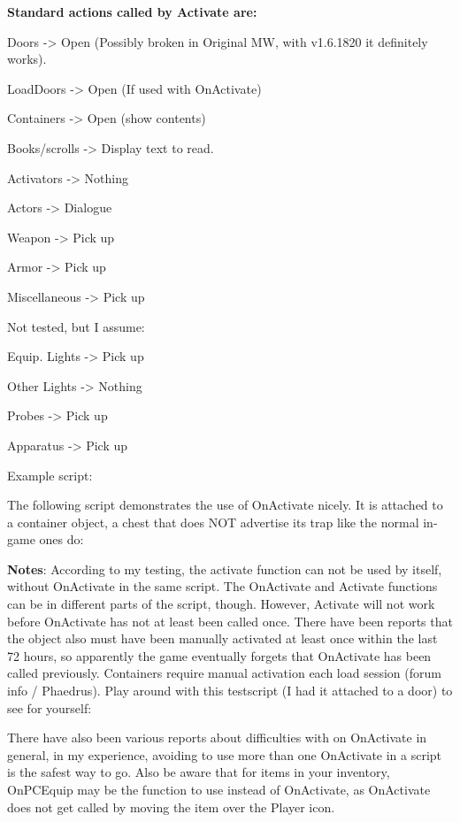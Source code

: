 \textbf{Standard actions called by Activate are:}

Doors -> Open (Possibly broken in Original MW, with
v1.6.1820 it definitely works).

LoadDoors -> Open (If used with OnActivate)

Containers -> Open (show contents)

Books/scrolls -> Display text to read.

Activators -> Nothing

Actors -> Dialogue

Weapon -> Pick up

Armor -> Pick up

Miscellaneous -> Pick up

Not tested, but I assume:

Equip. Lights -> Pick up

Other Lights -> Nothing

Probes -> Pick up

Apparatus -> Pick up

Example script:

The following script demonstrates the use of OnActivate nicely. It is
attached to a container object, a chest that does NOT advertise its trap
like the normal in-game ones do:



\textbf{Notes}: According to my testing, the activate function can not be used by itself, without OnActivate in the same script. The OnActivate and Activate functions can be in different parts of the script, though. However, Activate will not work before OnActivate has not at least been called once. There have been reports that the object also must have been manually activated at least once within the last 72 hours, so apparently the game eventually forgets that OnActivate has been called previously. Containers require manual activation each load session (forum info / Phaedrus). Play around with this testscript (I had it attached to a door) to
see for yourself:



There have also been various reports about difficulties with on
OnActivate in general, in my experience, avoiding to use more than one
OnActivate in a script is the safest way to go. Also be aware that for
items in your inventory, OnPCEquip may be the function to use instead of
OnActivate, as OnActivate does not get called by moving the item over
the Player icon.

